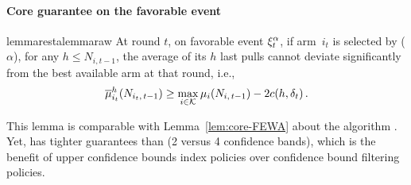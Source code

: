 \paragraph{Core guarantee on the favorable event}

\begin{restatable}{lemma}{restalemmaraw}
\label{lem:core-RAWUCB}
At round $t$, on favorable event $\xi^\alpha_t$, if arm~$i_{t}$ is selected by \RUCB($\alpha$), for any $h \leq N_{i,t-1}$,  the average of its $h$ last pulls cannot deviate significantly from the best available arm at that round, i.e.,
%
\begin{equation*}
\overline{\mu}_{i_t}^{h}(N_{i_t,\, t-1}) \geq \max_{i \in \mathcal{K}} \mu_{i}(N_{i,\,t-1}) - 2 c(h, \delta_t)\,.
\end{equation*}
\end{restatable}
This lemma is comparable with Lemma~\ref{lem:core-FEWA} about the algorithm \FEWA. Yet, \RUCB has tighter guarantees than \FEWA (2 versus 4 confidence bands), which is the benefit of upper confidence bounds index policies over confidence bound filtering policies. 

